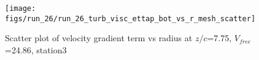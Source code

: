 \begin{figure}[H]
\centering
\texttt{[image: figs/run\_26/run\_26\_turb\_visc\_ettap\_bot\_vs\_r\_mesh\_scatter]}
\caption{Scatter plot of velocity gradient term vs radius at $z/c$=7.75, $V_{free}$=24.86, station3}
\label{fig:run_26_turb_visc_ettap_bot_vs_r_mesh_scatter}
\end{figure}


